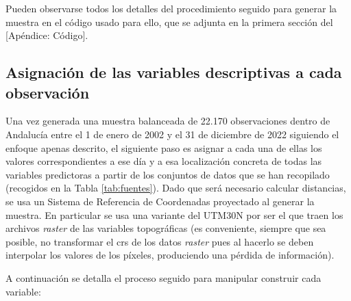 \documentclass[12pt,a4paper,]{book}
\numberwithin{dummy}{section}
\theoremstyle{ocrenumbox}
\theoremstyle{blacknumex}
\theoremstyle{blacknumbox}
\theoremstyle{ocrenum}
\theoremstyle{ocrenum}
\begin{document}
Pueden observarse todos los detalles del procedimiento seguido para
generar la muestra en el código usado para ello, que se adjunta en la
primera sección del {[}Apéndice: Código{]}.

\hypertarget{asignaciuxf3n-de-las-variables-descriptivas-a-cada-observaciuxf3n}{%
\subsection{Asignación de las variables descriptivas a cada
observación}\label{asignaciuxf3n-de-las-variables-descriptivas-a-cada-observaciuxf3n}}

Una vez generada una muestra balanceada de 22.170 observaciones dentro
de Andalucía entre el 1 de enero de 2002 y el 31 de diciembre de 2022
siguiendo el enfoque apenas descrito, el siguiente paso es asignar a
cada una de ellas los valores correspondientes a ese día y a esa
localización concreta de todas las variables predictoras a partir de los
conjuntos de datos que se han recopilado (recogidos en la Tabla
\ref{tab:fuentes}). Dado que será necesario calcular distancias, se usa
un Sistema de Referencia de Coordenadas proyectado al generar la
muestra. En particular se usa una variante del UTM30N por ser el que
traen los archivos \emph{raster} de las variables topográficas (es
conveniente, siempre que sea posible, no transformar el crs de los datos
\emph{raster} pues al hacerlo se deben interpolar los valores de los
píxeles, produciendo una pérdida de información).

A continuación se detalla el proceso seguido para manipular construir
cada variable:
\end{document}
